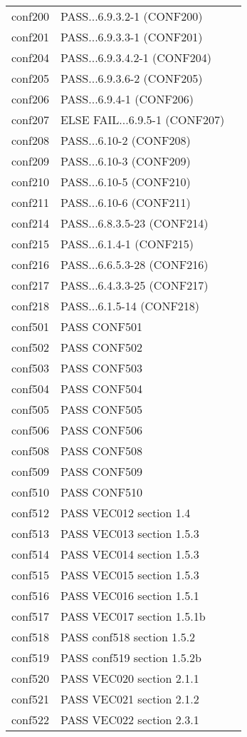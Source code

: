 \begin{tabular}{llc}
  conf200& PASS...6.9.3.2-1 (CONF200)&\\
  conf201& PASS...6.9.3.3-1 (CONF201)&\\
  conf204& PASS...6.9.3.4.2-1 (CONF204)&\\
  conf205& PASS...6.9.3.6-2 (CONF205)&\\
  conf206& PASS...6.9.4-1 (CONF206)&\\
  conf207& ELSE FAIL...6.9.5-1 (CONF207)&\\
  conf208& PASS...6.10-2 (CONF208)&\\
  conf209& PASS...6.10-3 (CONF209)&\\
  conf210& PASS...6.10-5 (CONF210)&\\
  conf211& PASS...6.10-6 (CONF211)&\\
  conf214& PASS...6.8.3.5-23 (CONF214)&\\
  conf215& PASS...6.1.4-1 (CONF215)&\\
  conf216& PASS...6.6.5.3-28 (CONF216)&\\
  conf217& PASS...6.4.3.3-25 (CONF217)&\\
  conf218& PASS...6.1.5-14 (CONF218)&\\
  conf501&PASS CONF501&\\
  conf502&PASS CONF502&\\
  conf503&PASS CONF503&\\
  conf504&PASS CONF504&\\
  conf505&PASS CONF505&\\
  conf506&PASS CONF506&\\
  conf508&PASS CONF508&\\
  conf509&PASS CONF509&\\
  conf510&PASS CONF510&\\
  conf512&PASS VEC012 section 1.4&\\
  conf513&PASS VEC013 section 1.5.3&\\
  conf514&PASS VEC014 section 1.5.3&\\
  conf515&PASS VEC015 section 1.5.3&\\
  conf516&PASS VEC016 section 1.5.1&\\
  conf517&PASS VEC017 section 1.5.1b&\\
  conf518&PASS conf518 section 1.5.2&\\
  conf519&PASS conf519 section 1.5.2b&\\
  conf520&PASS VEC020 section 2.1.1&\\
  conf521&PASS VEC021 section 2.1.2&\\
  conf522&PASS VEC022 section 2.3.1&\\

\end{tabular}
